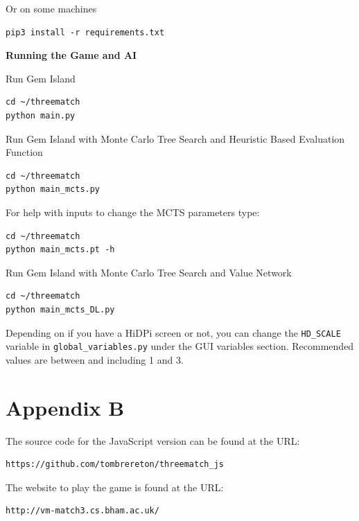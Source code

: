\documentclass{bhamthesis}
\theoremstyle{definition}
\begin{document}
\noindent Or on some machines
\begin{verbatim}
pip3 install -r requirements.txt
\end{verbatim}


\noindent \textbf{Running the Game and AI}

\noindent Run Gem Island
\begin{verbatim}
cd ~/threematch
python main.py
\end{verbatim}

\noindent Run Gem Island with Monte Carlo Tree Search and Heuristic Based Evaluation Function
\begin{verbatim}
cd ~/threematch
python main_mcts.py
\end{verbatim}


\noindent For help with inputs to change the MCTS parameters type:
\begin{verbatim}
cd ~/threematch
python main_mcts.pt -h
\end{verbatim}


\noindent Run Gem Island with Monte Carlo Tree Search and Value Network
\begin{verbatim}
cd ~/threematch
python main_mcts_DL.py
\end{verbatim}


\noindent Depending on if you have a HiDPi screen or not, you can change the \verb|HD_SCALE| variable
in \verb|global_variables.py| under the GUI variables section. Recommended values are between and including 1 and 3.


\newpage
\section*{Appendix B}
The source code for the JavaScript version can be found at the URL:

\begin{verbatim}
https://github.com/tombrereton/threematch_js
\end{verbatim}

\noindent The website to play the game is found at the URL:
\begin{verbatim}
http://vm-match3.cs.bham.ac.uk/
\end{verbatim}
\end{document}
